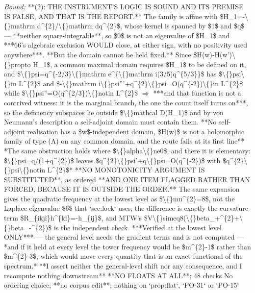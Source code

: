 \begin{description}
 \emph{Bound:}  **(2): THE INSTRUMENT'S LOGIC IS SOUND AND ITS PREMISE IS FALSE, AND THAT IS THE REPORT.** The family is affine with \$H\_1=-\textbackslash\{\}mathrm d\textasciicircum{}\{2\}/\textbackslash\{\}mathrm dq\textasciicircum{}\{2\}\$, whose kernel is spanned by \$1\$ and \$q\$ --- **neither square-integrable**, so \$0\$ is not an eigenvalue of \$H\_1\$ and ***66's algebraic exclusion WOULD close, at either sign, with no positivity used anywhere***.  **But the domain cannot be held fixed.** Since \$H(w)-H(w')\textbackslash\{\}propto H\_1\$, a common maximal domain requires \$H\_1\$ to be defined on it, and \$\textbackslash\{\}psi=q\textasciicircum{}\{-2/3\}\textbackslash\{\}mathrm e\textasciicircum{}\{\textbackslash\{\}mathrm i(3/5)q\textasciicircum{}\{5/3\}\}\$ has \$\textbackslash\{\}psi\textbackslash\{\}in L\textasciicircum{}\{2\}\$ and \$-\textbackslash\{\}mathrm i\textbackslash\{\}psi'''+q\textasciicircum{}\{2\}\textbackslash\{\}psi=O(q\textasciicircum{}\{-2\})\textbackslash\{\}in L\textasciicircum{}\{2\}\$ while \$\textbackslash\{\}psi''=O(q\textasciicircum{}\{2/3\})\textbackslash\{\}notin L\textasciicircum{}\{2\}\$ \ensuremath{\Rightarrow} ***and that function is not a contrived witness: it is the marginal branch, the one the count itself turns on***, so the deficiency subspaces lie outside \$\textbackslash\{\}mathcal D(H\_1)\$ and by von Neumann's description a self-adjoint domain must contain them. **No self-adjoint realisation has a \$w\$-independent domain, \$H(w)\$ is not a holomorphic family of type (A) on any common domain, and the route fails at its first line**  *The same obstruction holds where \$\textbackslash\{\}alpha\textbackslash\{\}ne0\$, and there it is elementary: \$\textbackslash\{\}psi=q/(1+q\textasciicircum{}\{2\})\$ leaves \$q\textasciicircum{}\{2\}\textbackslash\{\}psi'+q\textbackslash\{\}psi=O(q\textasciicircum{}\{-2\})\$ with \$q\textasciicircum{}\{2\}\textbackslash\{\}psi\textbackslash\{\}notin L\textasciicircum{}\{2\}\$*  **NO MONOTONICITY ARGUMENT IS SUBSTITUTED**, as ordered  **AND ONE ITEM FLAGGED RATHER THAN FORCED, BECAUSE IT IS OUTSIDE THE ORDER.** The same expansion gives the quadratic frequency at the lowest level as \$\textbackslash\{\}mu\textasciicircum{}\{2\}=8\$, not the Laplace eigenvalue \$6\$ that `sec:lock` uses; the difference is exactly the curvature term \$R\_\{ikjl\}h\textasciicircum{}\{kl\}=-h\_\{ij\}\$, and MTW's \$V\textbackslash\{\}simeq8(\textbackslash\{\}beta\_+\textasciicircum{}\{2\}+\textbackslash\{\}beta\_-\textasciicircum{}\{2\})\$ is the independent check.  ***Verified at the lowest level ONLY*** --- the general level needs the gradient terms and is not computed --- *and if it held at every level the tower frequency would be \$m\textasciicircum{}\{2\}-1\$ rather than \$m\textasciicircum{}\{2\}-3\$, which would move every quantity that is an exact functional of the spectrum.* **I assert neither the general-level shift nor any consequence, and I recompute nothing downstream**  **NO FLOATS AT ALL**; 48 checks  No ordering choice; **no corpus edit**; nothing on `prop:flat`, `PO-31` or `PO-15`

\end{description}
